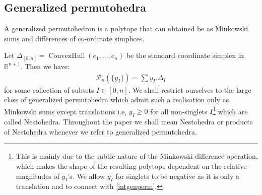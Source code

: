 \documentclass[hidelinks,12pt]{article}
\newcommand{\bea}[1]{\begin{eqnarray}\label{#1} }
\newcommand{\eea}{\end{eqnarray}}
\def\bea{\begin{eqnarray}}
\def\eea{\end{eqnarray}}
\begin{document}
\subsection{Generalized permutohedra}\label{GP}
A generalized permutohedron is a polytope that can obtained be as Minkowski sums and differences of co-ordinate simplices. 

Let $\Delta_{[0,n]} = \operatorname{ConvexHull}(e_1,\dots,e_n)$ be the standard coordinate simplex in $\mathbb{R}^{n+1}$. Then we have:
\bea
{\mathscr P_n}(\{y_I \})= \sum y_I . \Delta_I  
\eea
for some collection of subsets $I \in [0,n]$.
We shall restrict ourselves to the large class of generalized permutohedra which admit such a realisation only as Minkowski sums except translations i.e, $y_I \ge 0$ for all non-singlets $I$\footnote{This is mainly due to the subtle nature of the Minkowski difference operation, which makes the shape of the resulting polytope dependent on the relative magnitudes of $y_I$'s. We allow $y_I$ for singlets to be  negative as it is only a translation and to connect with \eqref{intgenperm}.} which are called Nestohedra. Throughout the paper we shall mean Nestohedra or products of Nestohedra whenever we refer to generalized permutohedra.
\end{document}
